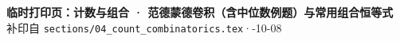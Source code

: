 \documentclass{article}
\begin{document}
	\begin{center}
		{\Large \textbf{临时打印页：计数与组合 · 范德蒙德卷积（含中位数例题）与常用组合恒等式}} \\[4pt]
		{\small 补印自 \texttt{sections/04\_count\_combinatorics.tex}\quad·-10-08}
	\end{center}

	\vspace{0.5em}

	
\end{document}
